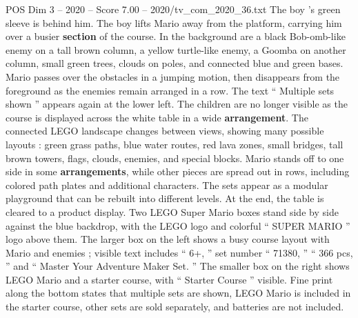 \begin{textsample}{POS Dim 3 – 2020 – Score 7.00 – 2020/tv\_com\_2020\_36.txt}
The boy ’s green sleeve is behind him.
The boy lifts Mario away from the platform, carrying him over a busier \textbf{section} of the course.
In the background are a black Bob-omb-like enemy on a tall brown column, a yellow turtle-like enemy, a Goomba on another column, small green trees, clouds on poles, and connected blue and green bases.
Mario passes over the obstacles in a jumping motion, then disappears from the foreground as the enemies remain arranged in a row.
The text “ Multiple sets shown ” appears again at the lower left.
The children are no longer visible as the course is displayed across the white table in a wide \textbf{arrangement}.
The connected LEGO landscape changes between views, showing many possible layouts : green grass paths, blue water routes, red lava zones, small bridges, tall brown towers, flags, clouds, enemies, and special blocks.
Mario stands off to one side in some \textbf{arrangements}, while other pieces are spread out in rows, including colored path plates and additional characters.
The sets appear as a modular playground that can be rebuilt into different levels.
At the end, the table is cleared to a product display.
Two LEGO Super Mario boxes stand side by side against the blue backdrop, with the LEGO logo and colorful “ SUPER MARIO ” logo above them.
The larger box on the left shows a busy course layout with Mario and enemies ; visible text includes “ 6+, ” set number “ 71380, ” “ 366 pcs, ” and “ Master Your Adventure Maker Set. ” The smaller box on the right shows LEGO Mario and a starter course, with “ Starter Course ” visible.
Fine print along the bottom states that multiple sets are shown, LEGO Mario is included in the starter course, other sets are sold separately, and batteries are not included.

\end{textsample}
